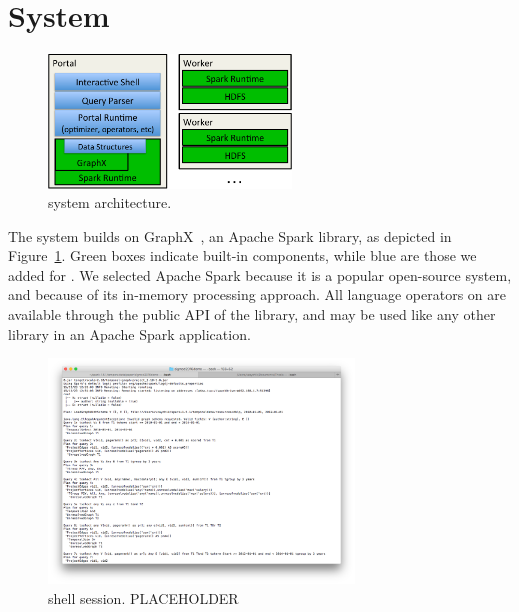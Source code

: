 \section{System}
\label{sec:sys}

\begin{figure}[t!]
\begin{center}
\includegraphics[height=1.4in]{figs/architecture.pdf}
\caption{\ql system architecture.}
\label{fig:arch}
\end{center}
\end{figure}

The \ql system builds on GraphX~\cite{DBLP:conf/osdi/GonzalezXDCFS14},
an Apache Spark library, as depicted in Figure~\ref{fig:arch}.  Green
boxes indicate built-in components, while blue are those we added for
\ql.  We selected Apache Spark because it is a popular open-source
system, and because of its in-memory processing approach.  All
language operators on \tgs are available through the public API of the
\ql library, and may be used like any other library in an Apache Spark
application.


\begin{figure}
\begin{center}
\includegraphics[width=3.2in]{figs/shell.png}
\caption{\ql shell session. PLACEHOLDER}
\label{fig:shell}
\end{center}
\end{figure}

